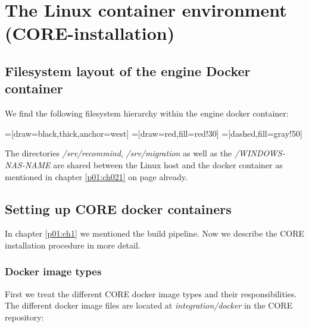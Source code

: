 \chapter{The Linux container environment (CORE-installation)}
	\section{Filesystem layout of the engine Docker container}
	We find the following filesystem hierarchy within the engine docker container:
	
	=[draw=black,thick,anchor=west]
	=[draw=red,fill=red!30]
	=[dashed,fill=gray!50]
	
	The directories \emph{/srv/recommind}, \emph{/srv/migration} as well as the \emph{/WINDOWS-NAS-NAME} are shared between the Linux host and the docker container as mentioned in chapter \ref{p01:ch021} on page \pageref{p01:ch021} already.
	\section{Setting up CORE docker containers}
	In chapter \ref{p01:ch1} we mentioned the build pipeline. Now we describe the CORE installation procedure in more detail.
		\subsection{Docker image types}
		First we treat the different CORE docker image types and their responsibilities. The different docker image files are located at \emph{integration/docker} in the CORE repository:
				
